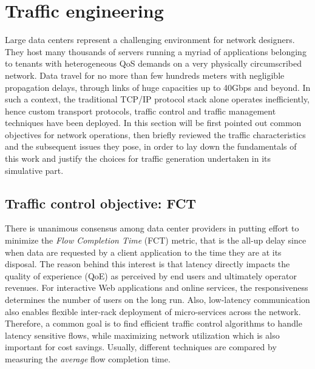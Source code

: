 \section{Traffic engineering}

Large data centers represent a challenging environment for network designers. They host many thousands of servers running a myriad of applications belonging to tenants with heterogeneous QoS demands on a very physically circumscribed network. Data travel for no more than few hundreds meters with negligible propagation delays, through links of huge capacities up to 40Gbps and beyond. In such a context, the traditional TCP/IP protocol stack alone operates inefficiently, hence custom transport protocols, traffic control and traffic management techniques have been deployed. In this section will be first pointed out common objectives for network operations, then briefly reviewed the traffic characteristics and the subsequent issues they pose, in order to lay down the fundamentals of this work and justify the choices for traffic generation undertaken in its simulative part.

\subsection{Traffic control objective: FCT}
There is unanimous consensus among data center providers in putting effort to minimize the \textit{Flow Completion Time} (FCT) metric, that is the all-up delay since when data are requested by a client application to the time they are at its disposal. The reason behind this interest is that latency directly impacts the quality of experience (QoE) as perceived by end users and ultimately operator revenues.  For interactive Web applications and online services, the responsiveness determines the number of users on the long run. Also, low-latency communication also enables flexible inter-rack deployment of micro-services across the network. Therefore, a common goal is to find efficient traffic control algorithms to handle latency sensitive flows, while maximizing network utilization which is also important for cost savings. Usually, different techniques are compared by measuring the \emph{average} flow completion time.\\

